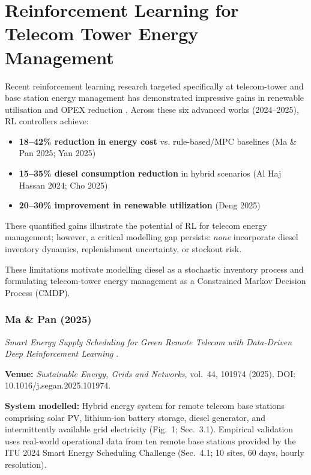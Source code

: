 \section{Reinforcement Learning for Telecom Tower Energy Management}
\label{sec:rl-telecom-tower}

Recent reinforcement learning research targeted specifically at telecom-tower and base station energy management has demonstrated impressive gains in renewable utilisation and OPEX reduction \cite{ma_pan_2025_telecom_ies, yan_2025_safe_marl_bs, alhajhassan_2024_battery_ageing_rl, deng_2025_5g_microgrid_ka, qi_2025_battery_swapping_inventory, cho_2025_solar_smallcell_ddqn}.
Across these six advanced works (2024--2025), RL controllers achieve:

\begin{itemize}
    \item \textbf{18--42\% reduction in energy cost} vs. rule-based/MPC baselines (Ma \& Pan 2025; Yan 2025)
    \item \textbf{15--35\% diesel consumption reduction} in hybrid scenarios (Al Haj Hassan 2024; Cho 2025)
    \item \textbf{20--30\% improvement in renewable utilization} (Deng 2025)
\end{itemize}

These quantified gains illustrate the potential of RL for telecom energy management; however, a critical modelling gap persists: \emph{none} incorporate diesel inventory dynamics, replenishment uncertainty, or stockout risk.


These limitations motivate modelling diesel as a stochastic inventory process and formulating telecom-tower energy management as a Constrained Markov Decision Process (CMDP).

\subsubsection{Ma \& Pan (2025)}
\label{sec:ma-pan}
\textit{Smart Energy Supply Scheduling for Green Remote Telecom with Data-Driven Deep Reinforcement Learning} \cite{ma_pan_2025_telecom_ies}.

\textbf{Venue:} \textit{Sustainable Energy, Grids and Networks}, vol.~44, 101974 (2025). DOI: 10.1016/j.segan.2025.101974.

\textbf{System modelled:} Hybrid energy system for remote telecom base stations comprising solar PV, lithium-ion battery storage, diesel generator, and intermittently available grid electricity (Fig.~1; Sec.~3.1). Empirical validation uses real-world operational data from ten remote base stations provided by the ITU 2024 Smart Energy Scheduling Challenge (Sec.~4.1; 10 sites, 60 days, hourly resolution).

